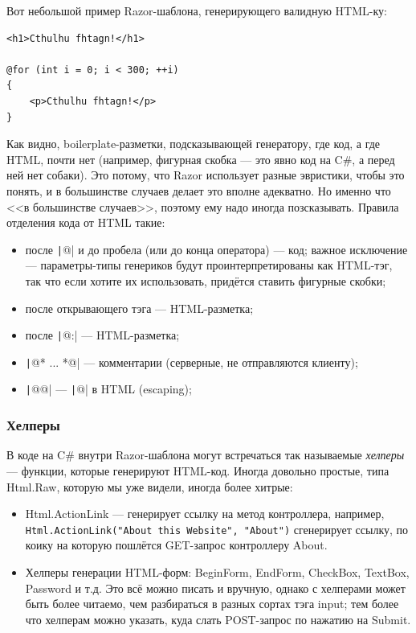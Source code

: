 \documentclass{../../text-style}
\begin{document}
Вот небольшой пример Razor-шаблона, генерирующего валидную HTML-ку:

\begin{verbatim}
<h1>Cthulhu fhtagn!</h1>

@for (int i = 0; i < 300; ++i)
{
    <p>Cthulhu fhtagn!</p>
}
\end{verbatim}

Как видно, boilerplate-разметки, подсказывающей генератору, где код, а где HTML, почти нет (например, фигурная скобка --- это явно код на C\#, а перед ней нет собаки). Это потому, что Razor использует разные эвристики, чтобы это понять, и в большинстве случаев делает это вполне адекватно. Но именно что <<в большинстве случаев>>, поэтому ему надо иногда позсказывать. Правила отделения кода от HTML такие:

\begin{itemize}
    \item после \texttt|@| и до пробела (или до конца оператора) --- код; важное исключение --- параметры-типы генериков будут проинтерпретированы как HTML-тэг, так что если хотите их использовать, придётся ставить фигурные скобки;
    \item после открывающего тэга --- HTML-разметка;
    \item после \texttt|@:| --- HTML-разметка;
    \item \texttt|@* ... *@| --- комментарии (серверные, не отправляются клиенту);
    \item \texttt|@@| --- \texttt|@| в HTML (escaping);
\end{itemize}

\subsubsection{Хелперы}

В коде на C\# внутри Razor-шаблона могут встречаться так называемые \emph{хелперы} --- функции, которые генерируют HTML-код. Иногда довольно простые, типа Html.Raw, которую мы уже видели, иногда более хитрые:

\begin{itemize}
    \item Html.ActionLink --- генерирует ссылку на метод контроллера, например, \texttt{Html.ActionLink("About this Website", "About")} сгенерирует ссылку, по коику на которую пошлётся GET-запрос контроллеру About.
    \item Хелперы генерации HTML-форм: BeginForm, EndForm, CheckBox, TextBox, Password и т.д. Это всё можно писать и вручную, однако с хелперами может быть более читаемо, чем разбираться в разных сортах тэга input; тем более что хелперам можно указать, куда слать POST-запрос по нажатию на Submit.
\end{itemize}
\end{document}
